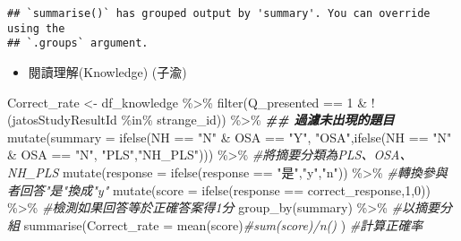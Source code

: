 \documentclass[
]{article}
\newenvironment{Shaded}{\begin{snugshade}}{\end{snugshade}}
\newcommand{\AttributeTok}[1]{\textcolor[rgb]{0.77,0.63,0.00}{#1}}
\newcommand{\CommentTok}[1]{\textcolor[rgb]{0.56,0.35,0.01}{\textit{#1}}}
\newcommand{\DecValTok}[1]{\textcolor[rgb]{0.00,0.00,0.81}{#1}}
\newcommand{\DocumentationTok}[1]{\textcolor[rgb]{0.56,0.35,0.01}{\textbf{\textit{#1}}}}
\newcommand{\FunctionTok}[1]{\textcolor[rgb]{0.00,0.00,0.00}{#1}}
\newcommand{\NormalTok}[1]{#1}
\newcommand{\OtherTok}[1]{\textcolor[rgb]{0.56,0.35,0.01}{#1}}
\newcommand{\SpecialCharTok}[1]{\textcolor[rgb]{0.00,0.00,0.00}{#1}}
\newcommand{\StringTok}[1]{\textcolor[rgb]{0.31,0.60,0.02}{#1}}
\providecommand{\tightlist}{%
  \setlength{\itemsep}{0pt}\setlength{\parskip}{0pt}}
\begin{document}
\begin{verbatim}
## `summarise()` has grouped output by 'summary'. You can override using the
## `.groups` argument.
\end{verbatim}

\begin{itemize}
\tightlist
\item
  閱讀理解(Knowledge) (子渝)
\end{itemize}

\begin{Shaded}
\begin{Highlighting}[]
\NormalTok{Correct\_rate }\OtherTok{\textless{}{-}}\NormalTok{ df\_knowledge }\SpecialCharTok{\%\textgreater{}\%} 
  \FunctionTok{filter}\NormalTok{(Q\_presented }\SpecialCharTok{==} \DecValTok{1} \SpecialCharTok{\&} \SpecialCharTok{!}\NormalTok{(jatosStudyResultId }\SpecialCharTok{\%in\%}\NormalTok{ strange\_id)) }\SpecialCharTok{\%\textgreater{}\%}   \DocumentationTok{\#\# 過濾未出現的題目}
  \FunctionTok{mutate}\NormalTok{(}\AttributeTok{summary =} \FunctionTok{ifelse}\NormalTok{(NH }\SpecialCharTok{==} \StringTok{"N"} \SpecialCharTok{\&}\NormalTok{ OSA }\SpecialCharTok{==} \StringTok{"Y"}\NormalTok{, }\StringTok{"OSA"}\NormalTok{,}\FunctionTok{ifelse}\NormalTok{(NH }\SpecialCharTok{==} \StringTok{"N"} \SpecialCharTok{\&}\NormalTok{ OSA }\SpecialCharTok{==} \StringTok{"N"}\NormalTok{, }\StringTok{"PLS"}\NormalTok{,}\StringTok{"NH\_PLS"}\NormalTok{))) }\SpecialCharTok{\%\textgreater{}\%}                                                             \CommentTok{\#將摘要分類為PLS、OSA、NH\_PLS}
  \FunctionTok{mutate}\NormalTok{(}\AttributeTok{response =} \FunctionTok{ifelse}\NormalTok{(response }\SpecialCharTok{==} \StringTok{"是"}\NormalTok{,}\StringTok{"y"}\NormalTok{,}\StringTok{"n"}\NormalTok{)) }\SpecialCharTok{\%\textgreater{}\%}       \CommentTok{\#轉換參與者回答"是"換成"y"}
  \FunctionTok{mutate}\NormalTok{(}\AttributeTok{score =} \FunctionTok{ifelse}\NormalTok{(response }\SpecialCharTok{==}\NormalTok{ correct\_response,}\DecValTok{1}\NormalTok{,}\DecValTok{0}\NormalTok{)) }\SpecialCharTok{\%\textgreater{}\%}  \CommentTok{\#檢測如果回答等於正確答案得1分}
  \FunctionTok{group\_by}\NormalTok{(summary) }\SpecialCharTok{\%\textgreater{}\%}                                         \CommentTok{\#以摘要分組}
  \FunctionTok{summarise}\NormalTok{(}\AttributeTok{Correct\_rate =} \FunctionTok{mean}\NormalTok{(score)}\CommentTok{\#sum(score)/n()}
\NormalTok{              )                      }\CommentTok{\#計算正確率}


\end{Highlighting}
\end{Shaded}
\end{document}
